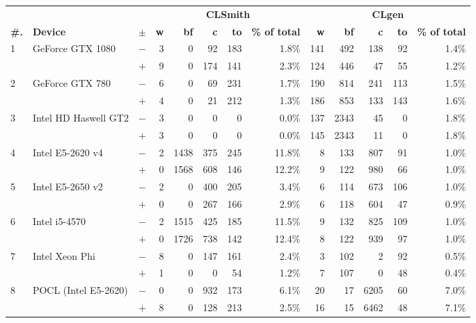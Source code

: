   \begin{tabular}{lll | rrrrr | rrrrr }
  \toprule
  & & & \multicolumn{5}{c|}{\textbf{CLSmith}} & \multicolumn{5}{c}{\textbf{CLgen}} \\
  \textbf{\#.} & \textbf{Device} & $\pm$ &
  \textbf{w} & \textbf{bf} & \textbf{c} & \textbf{to} & \textbf{\% of total} &
  \textbf{w} & \textbf{bf} & \textbf{c} & \textbf{to} & \textbf{\% of total} \\
  \midrule
  \multirow{ 2}{*}{1} & \multirow{ 2}{*}{GeForce GTX 1080} & $-$ & 3 & 0 & 92 & 183 & 1.8\%       & 141 & 492 & 138 & 92 & 1.4\% \\& & $+$ & 9 & 0 & 174 & 141 & 2.3\% & 124 & 446 & 47 & 55 & 1.2\% \\
\hline
\multirow{ 2}{*}{2} & \multirow{ 2}{*}{GeForce GTX 780} & $-$ & 6 & 0 & 69 & 231 & 1.7\%       & 190 & 814 & 241 & 113 & 1.5\% \\& & $+$ & 4 & 0 & 21 & 212 & 1.3\% & 186 & 853 & 133 & 143 & 1.6\% \\
\hline
\multirow{ 2}{*}{3} & \multirow{ 2}{*}{Intel HD Haswell GT2} & $-$ & 3 & 0 & 0 & 0 & 0.0\%       & 137 & 2343 & 45 & 0 & 1.8\% \\& & $+$ & 3 & 0 & 0 & 0 & 0.0\% & 145 & 2343 & 11 & 0 & 1.8\% \\
\hline
\multirow{ 2}{*}{4} & \multirow{ 2}{*}{Intel E5-2620 v4} & $-$ & 2 & 1438 & 375 & 245 & 11.8\%       & 8 & 133 & 807 & 91 & 1.0\% \\& & $+$ & 0 & 1568 & 608 & 146 & 12.2\% & 9 & 122 & 980 & 66 & 1.0\% \\
\hline
\multirow{ 2}{*}{5} & \multirow{ 2}{*}{Intel E5-2650 v2} & $-$ & 2 & 0 & 400 & 205 & 3.4\%       & 6 & 114 & 673 & 106 & 1.0\% \\& & $+$ & 0 & 0 & 267 & 166 & 2.9\% & 6 & 118 & 604 & 47 & 0.9\% \\
\hline
\multirow{ 2}{*}{6} & \multirow{ 2}{*}{Intel i5-4570} & $-$ & 2 & 1515 & 425 & 185 & 11.5\%       & 9 & 132 & 825 & 109 & 1.0\% \\& & $+$ & 0 & 1726 & 738 & 142 & 12.4\% & 8 & 122 & 939 & 97 & 1.0\% \\
\hline
\multirow{ 2}{*}{7} & \multirow{ 2}{*}{Intel Xeon Phi} & $-$ & 8 & 0 & 147 & 161 & 2.4\%       & 3 & 102 & 2 & 92 & 0.5\% \\& & $+$ & 1 & 0 & 0 & 54 & 1.2\% & 7 & 107 & 0 & 48 & 0.4\% \\
\hline
\multirow{ 2}{*}{8} & \multirow{ 2}{*}{POCL (Intel E5-2620)} & $-$ & 0 & 0 & 932 & 173 & 6.1\%       & 20 & 17 & 6205 & 60 & 7.0\% \\& & $+$ & 8 & 0 & 128 & 213 & 2.5\% & 16 & 15 & 6462 & 48 & 7.1\% \\

\end{tabular}
